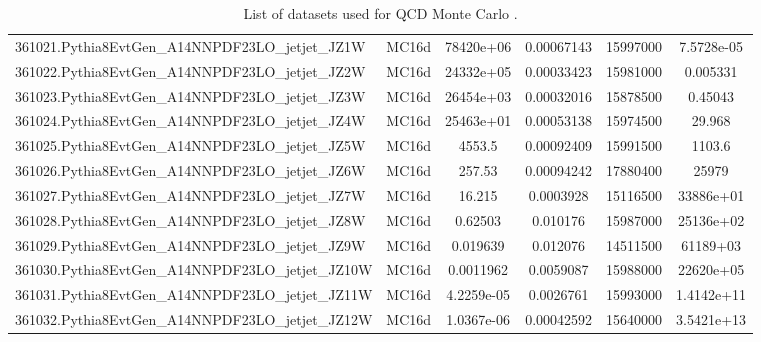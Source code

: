 \begin{sidewaystable}
{{\begin{tabular}{l|c|cccc}
    361021.Pythia8EvtGen\_A14NNPDF23LO\_jetjet\_JZ1W & MC16d & 78420e+06 & 0.00067143 & 15997000 & 7.5728e-05 \\
    361022.Pythia8EvtGen\_A14NNPDF23LO\_jetjet\_JZ2W & MC16d & 24332e+05 & 0.00033423 & 15981000 & 0.005331 \\
    361023.Pythia8EvtGen\_A14NNPDF23LO\_jetjet\_JZ3W & MC16d & 26454e+03 & 0.00032016 & 15878500 & 0.45043 \\
    361024.Pythia8EvtGen\_A14NNPDF23LO\_jetjet\_JZ4W & MC16d & 25463e+01 & 0.00053138 & 15974500 & 29.968 \\
    361025.Pythia8EvtGen\_A14NNPDF23LO\_jetjet\_JZ5W & MC16d & 4553.5 & 0.00092409 & 15991500 & 1103.6 \\
    361026.Pythia8EvtGen\_A14NNPDF23LO\_jetjet\_JZ6W & MC16d & 257.53 & 0.00094242 & 17880400 & 25979 \\
    361027.Pythia8EvtGen\_A14NNPDF23LO\_jetjet\_JZ7W & MC16d & 16.215 & 0.0003928 & 15116500 & 33886e+01 \\
    361028.Pythia8EvtGen\_A14NNPDF23LO\_jetjet\_JZ8W & MC16d & 0.62503 & 0.010176 & 15987000 & 25136e+02 \\
    361029.Pythia8EvtGen\_A14NNPDF23LO\_jetjet\_JZ9W & MC16d & 0.019639 & 0.012076 & 14511500 & 61189+03 \\
    361030.Pythia8EvtGen\_A14NNPDF23LO\_jetjet\_JZ10W & MC16d & 0.0011962 & 0.0059087 & 15988000 & 22620e+05 \\
    361031.Pythia8EvtGen\_A14NNPDF23LO\_jetjet\_JZ11W & MC16d & 4.2259e-05 & 0.0026761 & 15993000 & 1.4142e+11 \\
    361032.Pythia8EvtGen\_A14NNPDF23LO\_jetjet\_JZ12W & MC16d & 1.0367e-06 & 0.00042592 & 15640000 & 3.5421e+13 \\
  \end{tabular}}
  }
\caption{List of datasets used for QCD Monte Carlo \cite{Krizka:2310645}.}
\label{table:data:QCD}
\end{sidewaystable}

